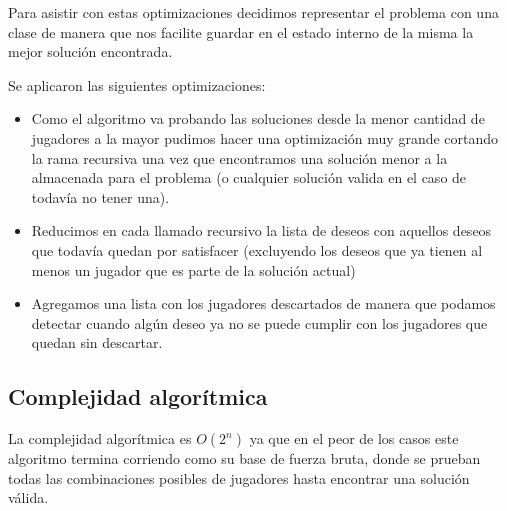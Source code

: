 \documentclass{estilo}
\begin{document}
Para asistir con estas optimizaciones decidimos representar el problema con una clase de manera que nos facilite guardar en el estado interno de la misma la mejor solución encontrada.

Se aplicaron las siguientes optimizaciones:
\begin{itemize}
\item{Como el algoritmo va probando las soluciones desde la menor cantidad de jugadores a la mayor pudimos hacer una optimización muy grande cortando la rama recursiva una vez que encontramos una solución menor a la almacenada para el problema (o cualquier solución valida en el caso de todavía no tener una).}

\item {Reducimos en cada llamado recursivo la lista de deseos con aquellos deseos que todavía quedan por satisfacer (excluyendo los deseos que ya tienen al menos un jugador que es parte de la solución actual)}

\item {Agregamos una lista con los jugadores descartados de manera que podamos detectar cuando algún deseo ya no se puede cumplir con los jugadores que quedan sin descartar.}

\end{itemize}

\subsection{Complejidad algorítmica}

La complejidad algorítmica es $O(2^n)$ ya que en el peor de los casos este algoritmo termina corriendo como su base de fuerza bruta, donde se prueban todas las combinaciones posibles de jugadores hasta encontrar una solución válida.

\newpage
\end{document}

